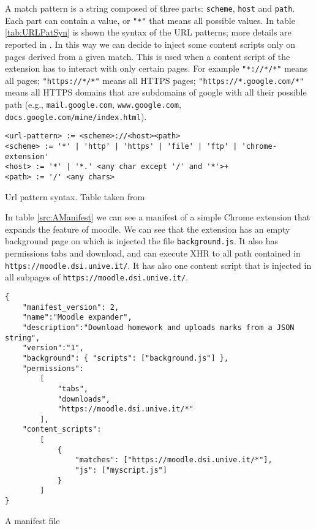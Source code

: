 A match pattern is a string composed of three parts: \texttt{scheme}, \texttt{host} and \texttt{path}. Each part can contain a value, or \texttt{"*"} that means all possible values. In table \ref{tab:URLPatSyn} is shown the syntax of the URL patterns; more details are reported in \cite{ChromeExtensionMatch}. In this way we can decide to inject some content scripts only on pages derived from a given match. This is used when a content script of the extension has to interact with only certain pages. For example \texttt{"*://*/*"} means all pages; \texttt{"https://*/*"} means all HTTPS pages; \texttt{"https://*.google.com/*"} means all HTTPS domains that are subdomains of google with all their possible path (e.g., \texttt{mail.google.com}, \texttt{www.google.com}, \texttt{docs.google.com/mine/index.html}).

\begin{table}[tlb]
\begin{verbatim}
<url-pattern> := <scheme>://<host><path>
<scheme> := '*' | 'http' | 'https' | 'file' | 'ftp' | 'chrome-extension'
<host> := '*' | '*.' <any char except '/' and '*'>+
<path> := '/' <any chars>
\end{verbatim}
\caption{Url pattern syntax. Table taken from \cite{ChromeExtensionMatch}}
\label{tab:URLPatSyn}
\end{table}

In table \ref{src:AManifest} we can see a manifest of a simple Chrome extension that expands the feature of moodle. We can see that the extension has an empty background page on which is injected the file \texttt{background.js}. It also has permissions tabs and download, and can execute XHR to all path contained in \texttt{https://moodle.dsi.unive.it/}. It has also one content script that is injected in all subpages of \texttt{https://moodle.dsi.unive.it/}.
\begin{table}[tlb]
\lstset{language=java,showstringspaces=false}
\begin{small}
\begin{lstlisting}
{
	"manifest_version": 2,
	"name":"Moodle expander",
	"description":"Download homework and uploads marks from a JSON string",
	"version":"1",
	"background": { "scripts": ["background.js"] },
	"permissions":  
		[
			"tabs",
			"downloads",
			"https://moodle.dsi.unive.it/*"
		],
	"content_scripts": 
		[
			{
				"matches": ["https://moodle.dsi.unive.it/*"],
				"js": ["myscript.js"]
			}
		]
}
\end{lstlisting}
\end{small}
\caption{A manifest file}
\label{src:AManifest}
\end{table}


